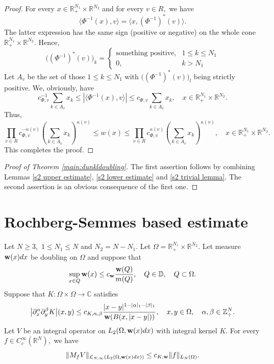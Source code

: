 \documentclass{amsart}
\begin{document}
\begin{proof} For every $x\in\mathbb{R}^{N_1}_+\times\mathbb{R}^{N_2}$ and for every $v\in R,$ we have
$$\langle \Phi^{-1}(x),v\rangle=\langle x,(\Phi^{-1})^{\ast}(v)\rangle.$$
The latter expression has the same sign (positive or negative) on the whole cone $\mathbb{R}^{N_1}_+\times\mathbb{R}^{N_2}.$ Hence,
$$\big((\Phi^{-1})^{\ast}(v)\big)_k=
\begin{cases}
\mbox{something positive},& 1\leq k\leq N_1\\
0,& k>N_1
\end{cases}
$$
Let $A_v$ be the set of those $1\leq k\leq N_1$ with $\big((\Phi^{-1})^{\ast}(v)\big)_l$ being strictly positive. We, obviously, have
$$c_{\Phi,v}^{-1}\sum_{k\in A_v}x_k\leq |\langle \Phi^{-1}(x),v\rangle|\leq c_{\Phi,v}\sum_{k\in A_v}x_k,\quad x\in \mathbb{R}^{N_1}_+\times\mathbb{R}^{N_2}.$$
Thus,
$$\prod_{v\in R}c_{\Phi,v}^{-\kappa(v)}(\sum_{k\in A_v}x_k)^{\kappa(v)}\leq w(x)\leq \prod_{v\in R}c_{\Phi,v}^{\kappa(v)}(\sum_{k\in A_v}x_k)^{\kappa(v)},\quad x\in\mathbb{R}_+^{N_1}\times\mathbb{R}^{N_2}.$$
This completes the proof.
\end{proof}

\begin{proof}[Proof of Theorem \ref{main:dunkldoubling}] The first assertion follows by combining Lemmas \ref{s2 upper estimate}, \ref{s2 lower estimate} and \ref{s2 trivial lemma}. The second assertion is an obvious consequence of the first one.
\end{proof}


\section{Rochberg-Semmes based estimate}

\begin{theorem}\label{RS-type theorem} Let $N\geq 3,$ $1\leq N_1\leq N$ and $N_2=N-N_1.$ Let $\Omega=\mathbb{R}^{N_1}_+\times\mathbb{R}^{N_2}.$ Let measure ${\bf w}(x)dx$ be doubling on $\Omega$ and suppose that
$$\sup_{x\in Q}{\bf w}(x)\leq c_{{\bf w}}\frac{{\bf w}(Q)}{m(Q)},\quad Q\in\mathbb{D},\quad Q\subset\Omega.$$
Suppose that $K:\Omega\times\Omega\to\mathbb{C}$
satisfies
$$\bigl|\partial_x^{\alpha}\partial_y^{\beta}K\bigr|(x,y)\leq c_{K,\alpha,\beta}\frac{|x-y|^{1-|\alpha|_1-|\beta|_1}}{{\bf w}(B(x,|x-y|))},\quad x,y\in\Omega,\quad \alpha,\beta\in\mathbb{Z}^N_+.$$
Let $V$ be an integral operator on $L_2(\Omega,{\bf w}(x)dx)$ with integral kernel $K.$ For every $f\in C^{\infty}_c(\mathbb{R}^N),$ we have
$$\|M_fV\|_{\mathcal{L}_{N,\infty}(L_2(\Omega,{\bf w}(x)dx))}\leq c_{K,{\bf w}}\| f\|_{L_N(\Omega)}.$$
\end{theorem}
\end{document}
